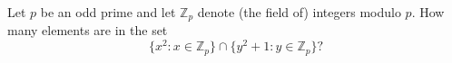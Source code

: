 Let $p$ be an odd prime and let $\mathbb{Z}_p$ denote (the field of) integers
modulo $p$. How many elements are in the set
\[
\{x^2: x \in \mathbb{Z}_p\} \cap \{y^2 + 1 : y \in \mathbb{Z}_p\}?
\]
